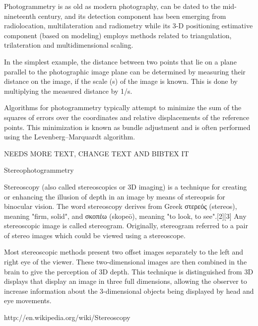 Photogrammetry is as old as modern photography, can be dated to the mid-nineteenth century, and its detection component has been emerging from radiolocation, multilateration and radiometry while its 3-D positioning estimative component (based on modeling) employs methods related to triangulation, trilateration and multidimensional scaling.

In the simplest example, the distance between two points that lie on a plane parallel to the photographic image plane can be determined by measuring their distance on the image, if the scale (s) of the image is known. This is done by multiplying the measured distance by 1/s.

Algorithms for photogrammetry typically attempt to minimize the sum of the squares of errors over the coordinates and relative displacements of the reference points. This minimization is known as bundle adjustment and is often performed using the Levenberg–Marquardt algorithm.

NEEDS MORE TEXT, CHANGE TEXT AND BIBTEX IT

Stereophotogrammetry

Stereoscopy (also called stereoscopics or 3D imaging) is a technique for creating or enhancing the illusion of depth in an image by means of stereopsis for binocular vision. The word stereoscopy derives from Greek στερεός (stereos), meaning "firm, solid", and σκοπέω (skopeō), meaning "to look, to see".[2][3] Any stereoscopic image is called stereogram. Originally, stereogram referred to a pair of stereo images which could be viewed using a stereoscope.

Most stereoscopic methods present two offset images separately to the left and right eye of the viewer. These two-dimensional images are then combined in the brain to give the perception of 3D depth. This technique is distinguished from 3D displays that display an image in three full dimensions, allowing the observer to increase information about the 3-dimensional objects being displayed by head and eye movements.

http://en.wikipedia.org/wiki/Stereoscopy








